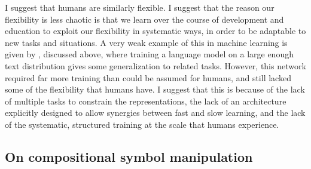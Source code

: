 I suggest that humans are similarly flexible. I suggest that the reason our flexibility is less chaotic is that we learn over the course of development and education to exploit our flexibility in systematic ways, in order to be adaptable to new tasks and situations. A very weak example of this in machine learning is given by \citet{Radford2019}, discussed above, where training a language model on a large enough text distribution gives some generalization to related tasks. However, this network required far more training than could be assumed for humans, and still lacked some of the flexibility that humans have. I suggest that this is because of the lack of multiple tasks to constrain the representations, the lack of an architecture explicitly designed to allow synergies between fast and slow learning, and the lack of the systematic, structured training at the scale that humans experience. \par 

\subsection{On compositional symbol manipulation}

